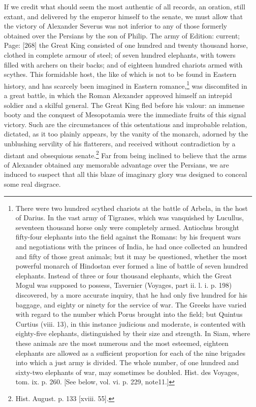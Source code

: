 If we credit what should seem the most authentic of all records, an oration, still extant, and delivered by the emperor himself to the senate, we must allow that the victory of Alexander Severus was not inferior to any of those formerly obtained over the Persians by the son of Philip. The army of Edition: current; Page: [268] the Great King consisted of one hundred and twenty thousand horse, clothed in complete armour of steel; of seven hundred elephants, with towers filled with archers on their backs; and of eighteen hundred chariots armed with scythes. This formidable host, the like of which is not to be found in Eastern history, and has scarcely been imagined in Eastern romance,\footnote{There were two hundred scythed chariots at the battle of Arbela, in the host of Darius. In the vast army of Tigranes, which was vanquished by Lucullus, seventeen thousand horse only were completely armed. Antiochus brought fifty-four elephants into the field against the Romans: by his frequent wars and negotiations with the princes of India, he had once collected an hundred and fifty of those great animals; but it may be questioned, whether the most powerful monarch of Hindostan ever formed a line of battle of seven hundred elephants. Instead of three or four thousand elephants, which the Great Mogul was supposed to possess, Tavernier (Voyages, part ii. l. i. p. 198) discovered, by a more accurate inquiry, that he had only five hundred for his baggage, and eighty or ninety for the service of war. The Greeks have varied with regard to the number which Porus brought into the field; but Quintus Curtius (viii. 13), in this instance judicious and moderate, is contented with eighty-five elephants, distinguished by their size and strength. In Siam, where these animals are the most numerous and the most esteemed, eighteen elephants are allowed as a sufficient proportion for each of the nine brigades into which a just army is divided. The whole number, of one hundred and sixty-two elephants of war, may sometimes be doubled. Hist. des Voyages, tom. ix. p. 260. [See below, vol. vi. p. 229, note11.]} was discomfited in a great battle, in which the Roman Alexander approved himself an intrepid soldier and a skilful general. The Great King fled before his valour: an immense booty and the conquest of Mesopotamia were the immediate fruits of this signal victory. Such are the circumstances of this ostentatious and improbable relation, dictated, as it too plainly appears, by the vanity of the monarch, adorned by the unblushing servility of his flatterers, and received without contradiction by a distant and obsequious senate.\footnote{Hist. August. p. 133 [xviii. 55].} Far from being inclined to believe that the arms of Alexander obtained any memorable advantage over the Persians, we are induced to suspect that all this blaze of imaginary glory was designed to conceal some real disgrace.

